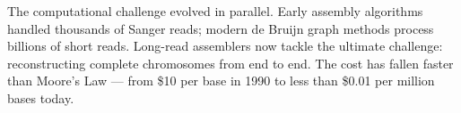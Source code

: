 \begin{historical}
The computational challenge evolved in parallel. Early assembly algorithms handled thousands of Sanger reads; modern de Bruijn graph methods process billions of short reads. Long-read assemblers now tackle the ultimate challenge: reconstructing complete chromosomes from end to end. The cost has fallen faster than Moore's Law — from \$10 per base in 1990 to less than \$0.01 per million bases today.

\end{historical}
